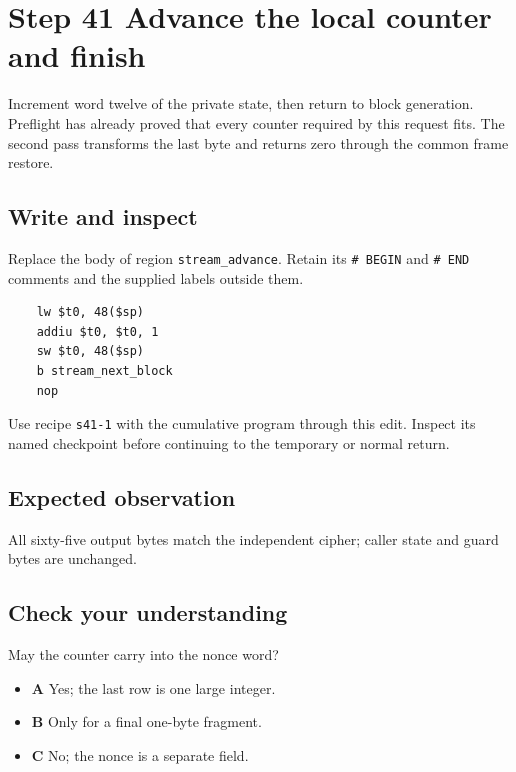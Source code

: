 \section{Step 41 Advance the local counter and finish}\label{chacha-s41}

Increment word twelve of the private state, then return to block generation. Preflight has already proved that every counter required by this request fits. The second pass transforms the last byte and returns zero through the common frame restore.

\subsection{Write and inspect}
Replace the body of region \texttt{stream\_advance}. Retain its \texttt{\# BEGIN} and \texttt{\# END} comments and the supplied labels outside them.

\begin{verbatim}
    lw $t0, 48($sp)
    addiu $t0, $t0, 1
    sw $t0, 48($sp)
    b stream_next_block
    nop
\end{verbatim}

Use recipe \texttt{s41-1} with the cumulative program through this edit. Inspect its named checkpoint before continuing to the temporary or normal return.

\subsection{Expected observation}
All sixty-five output bytes match the independent cipher; caller state and guard bytes are unchanged.

\subsection{Check your understanding}
May the counter carry into the nonce word?

\begin{itemize}
  \item \textbf{A} Yes; the last row is one large integer.
  \item \textbf{B} Only for a final one-byte fragment.
  \item \textbf{C} No; the nonce is a separate field.
\end{itemize}
